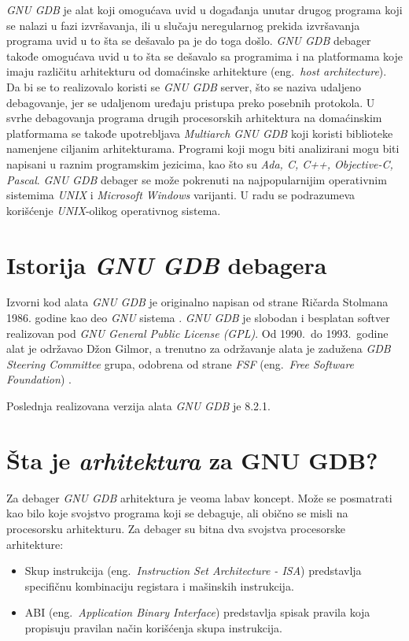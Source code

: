 \documentclass[12pt,oneside]{memoir}
\begin{document}
\emph{GNU GDB} je alat koji omogućava uvid u događanja unutar drugog programa koji se nalazi u fazi izvršavanja, ili u slučaju neregularnog prekida izvršavanja programa uvid u to šta se dešavalo pa je do toga došlo. \emph{GNU GDB} debager takođe omogućava uvid u to šta se dešavalo sa programima i na platformama koje imaju različitu arhitekturu od domaćinske arhitekture (eng.~\emph{host architecture}). Da bi se to realizovalo koristi se \emph{GNU GDB} server, što se naziva udaljeno debagovanje, jer se udaljenom uređaju pristupa preko posebnih protokola. U svrhe debagovanja programa drugih procesorskih arhitektura na domaćinskim platformama se takođe upotrebljava \emph{Multiarch GNU GDB} koji koristi biblioteke namenjene ciljanim arhitekturama. Programi koji mogu biti analizirani mogu biti napisani u raznim programskim jezicima, kao što su \emph{Ada, C, C++, Objective-C, Pascal}. \emph{GNU GDB} debager se može pokrenuti na najpopularnijim operativnim sistemima \emph{UNIX} i \emph{Microsoft Windows} varijanti. U radu se podrazumeva korišćenje \emph{UNIX}-olikog operativnog sistema.

\section{Istorija \emph{GNU GDB} debagera}

Izvorni kod alata \emph{GNU GDB} je originalno napisan od strane Ričarda Stolmana 1986. godine kao deo \emph{GNU} sistema \cite{GDBDOC}. \emph{GNU GDB} je slobodan i besplatan softver realizovan pod \emph{GNU General Public License (GPL)}. Od 1990.~do 1993.~godine alat je održavao Džon Gilmor, a trenutno za održavanje alata je zadužena \emph{GDB Steering Committee} grupa, odobrena od strane \emph{FSF} (eng.~\emph{Free Software Foundation}) \cite{FSF}.

Poslednja realizovana verzija alata \emph{GNU GDB} je 8.2.1.

\section{Šta je \emph{arhitektura} za GNU GDB?}

Za debager \emph{GNU GDB} arhitektura je veoma labav koncept. Može se posmatrati kao bilo koje svojstvo programa koji se debaguje, ali obično se misli na procesorsku arhitekturu. Za debager su bitna dva svojstva procesorske arhitekture:

\begin{itemize}
	\item Skup instrukcija (eng.~\emph{Instruction Set Architecture - ISA}) predstavlja specifičnu kombinaciju registara i mašinskih instrukcija.
	\item ABI (eng.~\emph{Application Binary Interface}) predstavlja spisak pravila koja propisuju pravilan način korišćenja skupa instrukcija.
\end{itemize}
\end{document}

